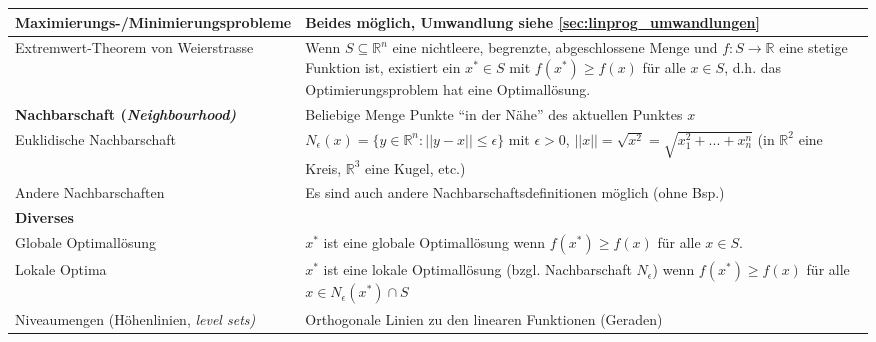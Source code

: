 \begin{tabularx}{\textwidth}{p{7cm} X}
  \hline
    \textbf{Maximierungs-/Minimierungsprobleme} & Beides möglich, Umwandlung siehe \ref{sec:linprog_umwandlungen}\\
  \hline
    Extremwert-Theorem von Weierstrasse
      & Wenn $S \subseteq \mathbb{R}^n$ eine nichtleere, begrenzte, abgeschlossene Menge und $f: S \rightarrow \mathbb{R}$ eine stetige Funktion ist, existiert ein $x^* \in S$ mit $f(x^*) \geq f(x)$
       für alle $x \in S$, d.h. das Optimierungsproblem hat eine Optimallösung.\\
  \hline
    \textbf{Nachbarschaft (\em Neighbourhood\em)} & Beliebige Menge Punkte "`in der Nähe"' des aktuellen Punktes $x$\\
  \hline
    Euklidische Nachbarschaft
      & $N_\epsilon(x) = \{ y \in \mathbb{R}^n: ||y-x|| \leq \epsilon \}$ mit $\epsilon > 0$, $||x|| = \sqrt{x^2} = \sqrt{x_1^2 + ... + x_n^n}$ (in $\mathbb{R}^2$ eine Kreis, $\mathbb{R}^3$ eine Kugel, etc.)\\
    Andere Nachbarschaften
      & Es sind auch andere Nachbarschaftsdefinitionen möglich (ohne Bsp.)\\
  \hline
    \textbf{Diverses} &\\
  \hline
      Globale Optimallösung
      & $x^*$ ist eine globale Optimallösung wenn $f(x^*) \geq f(x)$ für alle $x \in S$.\\
    Lokale Optima
      & $x^*$ ist eine lokale Optimallösung (bzgl. Nachbarschaft $N_\epsilon$) wenn $f(x^*) \geq f(x)$ für alle $x \in N_\epsilon(x^*) \cap S$\\
    Niveaumengen (Höhenlinien, \em level sets\em)
      & Orthogonale Linien zu den linearen Funktionen (Geraden)\\      
  \end{tabularx}
  

